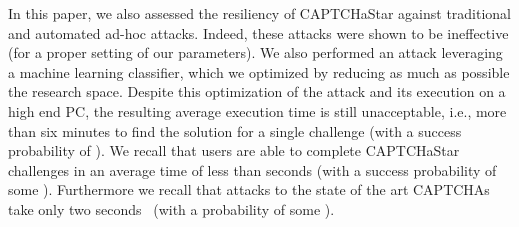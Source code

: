 \documentclass[conference]{IEEEtran}
\begin{document}
In this paper, we also assessed the resiliency of CAPTCHaStar against traditional and automated ad-hoc attacks.
Indeed, these attacks were shown to be ineffective (for a proper setting of our parameters). We also performed an attack leveraging a machine learning classifier, which we optimized by reducing as much as possible the research space.
Despite this optimization of the attack and its execution on a high end PC, the resulting average execution time is still unacceptable,
i.e., more than six minutes to find the solution for a single challenge (with a success probability of ).
We recall that users are able to complete CAPTCHaStar challenges in an average time of less than  seconds (with a success probability of some ).
Furthermore we recall that attacks to the state of the art CAPTCHAs take only two seconds~\cite{bursztein2014end} (with a probability of some ).
\balance

\end{document}

